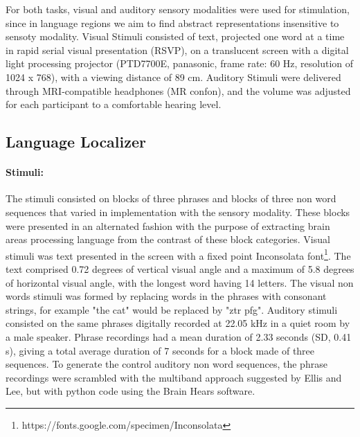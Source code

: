 For both tasks, visual and auditory sensory modalities were used for stimulation, since in language regions we aim to find abstract representations insensitive to sensoty modality.
Visual Stimuli consisted of text, projected one word at a time in rapid serial visual presentation (RSVP), on a translucent screen with a digital light processing projector (PTD7700E, panasonic, frame rate: 60 Hz, resolution of 1024 x 768), with a viewing distance of 89 cm.
Auditory Stimuli were delivered through MRI-compatible headphones (MR confon), and the volume was adjusted for each participant to a comfortable hearing level.


\subsection{Language Localizer}

\paragraph{Stimuli:}
The stimuli consisted on blocks of three phrases and blocks of three non word sequences that varied in implementation with the sensory modality.
These blocks were presented in an alternated fashion with the purpose of extracting brain areas processing language from the contrast of these block categories\citep{mahowald2016reliable}.
Visual stimuli was text presented in the screen with a fixed point Inconsolata font\footnote{https://fonts.google.com/specimen/Inconsolata}.
The text comprised 0.72 degrees of vertical visual angle and a maximum of 5.8 degrees of horizontal visual angle, with the longest word having 14 letters.
The visual non words stimuli was formed by replacing words in the phrases with consonant strings, for example "the cat" would be replaced by "ztr pfg".
Auditory stimuli consisted on the same phrases digitally recorded at 22.05 kHz in a quiet room by a male speaker.
Phrase recordings had a mean duration of 2.33 seconds (SD, 0.41 s), giving a total average duration of 7 seconds for a block made of three sequences.
To generate the control auditory non word sequences, the phrase recordings were scrambled with the multiband approach suggested by Ellis and Lee\citep{ellis2010time}, but with python code using the Brain Hears software\citep{fontaine2011brian}.

